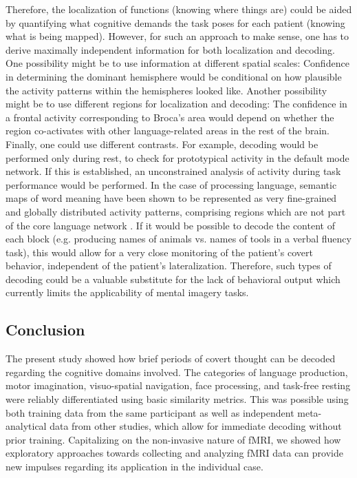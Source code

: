 \documentclass[fleqn,10pt]{SelfArx} %
\begin{document}
Therefore, the localization of functions (knowing where things are) could be aided by quantifying what cognitive demands the task poses for each patient (knowing what is being mapped). However, for such an approach to make sense, one has to derive maximally independent information for both localization and decoding. One possibility might be to use information at different spatial scales: Confidence in determining the dominant hemisphere would be conditional on how plausible the activity patterns within the hemispheres looked like. Another possibility might be to use different regions for localization and decoding: The confidence in a frontal activity corresponding to Broca's area would depend on whether the region co-activates with other language-related areas in the rest of the brain. Finally, one could use different contrasts. For example, decoding would be performed only during rest, to check for prototypical activity in the default mode network. If this is established, an unconstrained analysis of activity during task performance would be performed.
In the case of processing language, semantic maps of word meaning have been shown to be represented as very fine-grained and globally distributed activity patterns, comprising regions which are not part of the core language network \citep{Huth_2016}. If it would be possible to decode the content of each block (e.g. producing names of animals vs. names of tools in a verbal fluency task), this would allow for a very close monitoring of the patient’s covert behavior, independent of the patient's lateralization. Therefore, such types of decoding could be a valuable substitute for the lack of behavioral output which currently limits the applicability of mental imagery tasks.

\subsection*{Conclusion}
The present study showed how brief periods of covert thought can be decoded regarding the cognitive domains involved. The categories of language production, motor imagination, visuo-spatial navigation, face processing, and task-free resting were reliably differentiated using basic similarity metrics. This was possible using both training data from the same participant as well as independent meta-analytical data from other studies, which allow for immediate decoding without prior training. Capitalizing on the non-invasive nature of fMRI, we showed how exploratory approaches towards collecting and analyzing fMRI data can provide new impulses regarding its application in the individual case.
\end{document}
